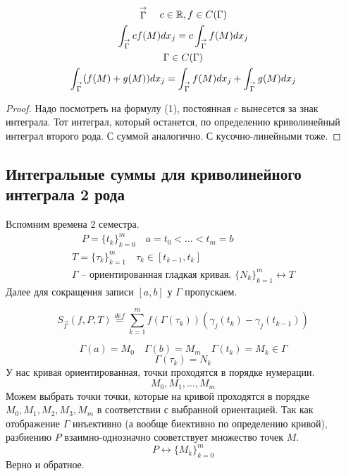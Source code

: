 \documentclass[main]{subfiles}
\begin{document}
\begin{theorem}
    \begin{gather*}
        \stackrel{\rightarrow}{\Gamma} \quad c \in \mathbb{R}, f \in C(\Gamma) \\
        \int_{\stackrel{\rightarrow}{\Gamma}} cf(M)dx_j = c \int_{\stackrel{\rightarrow}{\Gamma}} f(M) dx_j\\
        \Gamma \in C(\Gamma) \\
        \int_{\stackrel{\rightarrow}{\Gamma}} (f(M) + g(M)) dx_j = \int_{\stackrel{\rightarrow}{\Gamma}} f(M) dx_j +
        \int_{\stackrel{\rightarrow}{\Gamma}} g(M)dx_j \\
    \end{gather*}
\end{theorem}
\begin{proof}
    Надо посмотреть на формулу (1), постоянная $c$ вынесется за знак интеграла. Тот интеграл, который останется, по определению криволинейный интеграл второго рода.
    С суммой аналогично. С кусочно-линейными тоже.
\end{proof}

\subsection{Интегральные суммы для криволинейного интеграла 2 рода}
Вспомним времена 2 семестра.
\begin{gather*}
    [a,b] \quad P = \{ t_k \}^m_{k=0} \quad a = t_0 < \ldots < t_m = b \\
    T = \{ \tau_k \}^m_{k=1} \quad \tau_k \in [t_{k-1},t_k] \\
    \Gamma \text{ -- ориентированная гладкая кривая. }
    \{ N_k \}^m_{k=1} \leftrightarrow T
\end{gather*}
Далее для сокращения записи $[a,b]$ у $\Gamma$ пропускаем.
\begin{definition}
    \[S_{\stackrel{\rightarrow}{\Gamma}} (f,P,T) \stackrel{def}{=} \sum^m_{k=1}f(\Gamma(\tau_k))(\gamma_j(t_k)-\gamma_j(t_{k-1})) \tag{3}\]
\end{definition}
\begin{remark}
    \[\Gamma(a) = M_0 \quad \Gamma(b) = M_m \quad \Gamma(t_k) = M_k \in \Gamma \]
    \[\Gamma(\tau_k) = N_k \]
    У нас кривая ориентированная, точки проходятся в порядке нумерации.
    \[ M_0, M_1, \ldots, M_m \]
     Можем выбрать точки точки, которые на кривой проходятся в порядке $M_0, M_1, M_2, M_3, M_m$ в соответствии с выбранной ориентацией.
     Так как отображение $\Gamma$ инъективно (а вообще биективно по определению кривой), разбиению $P$ взаимно-однозначно сооветствует множество точек $M$.
     \[ P \leftrightarrow \{ M_k \}^m_{k=0}  \] Верно и обратное.
\end{remark}
\end{document}
